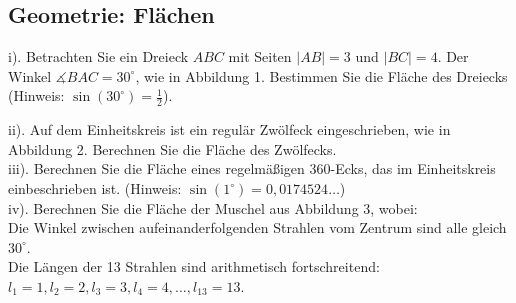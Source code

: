  
\begin{multicols}{2}
\section*{Geometrie: Flächen}

i). Betrachten Sie ein Dreieck $ABC$ mit Seiten $|AB|=3$ und $|BC|=4$. Der Winkel $\measuredangle BAC=30^{\circ}$, wie in Abbildung 1. Bestimmen Sie die Fläche des Dreiecks (Hinweis: $\sin(30^{\circ})=\frac{1}{2}$).


ii). Auf dem Einheitskreis ist ein regulär Zwölfeck eingeschrieben, wie in Abbildung 2. Berechnen Sie die Fläche des Zwölfecks.\\

iii). Berechnen Sie die Fläche eines regelmäßigen $360$-Ecks, das im Einheitskreis einbeschrieben ist. (Hinweis: $\sin(1^{\circ})=0,0174524\dots$)\\

iv). Berechnen Sie die Fläche der Muschel aus Abbildung 3, wobei:\\

Die Winkel zwischen aufeinanderfolgenden Strahlen vom Zentrum sind alle gleich $30^{\circ}$.\\

Die Längen der 13 Strahlen sind arithmetisch fortschreitend: \\

$l_1=1, l_2=2, l_3=3, l_4=4, \dots, l_{13}=13$. 



\end{multicols}
